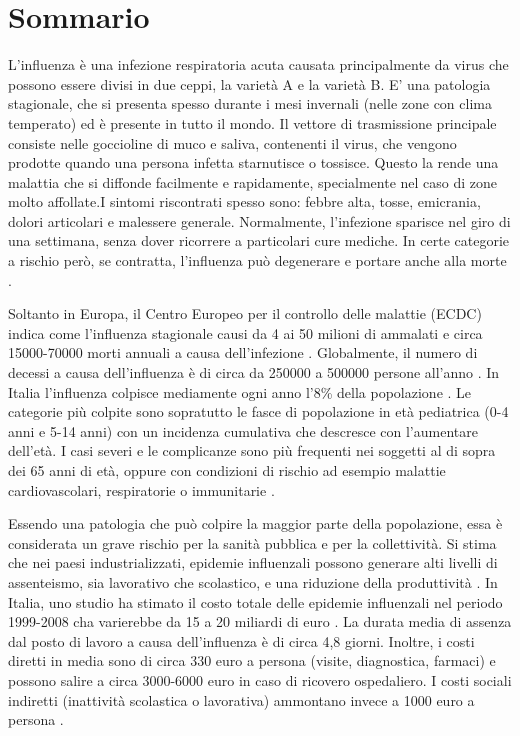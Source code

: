 \chapter*{Sommario} %
\label{sommario}


\bigskip
L'influenza è una infezione respiratoria acuta causata principalmente da virus che possono
essere divisi in due ceppi, la varietà A e la varietà B. E' una patologia stagionale,
che si presenta spesso durante i mesi invernali (nelle zone con clima temperato) ed è presente in tutto il mondo.
Il vettore di trasmissione principale consiste nelle goccioline di muco e saliva, contenenti il virus, che vengono prodotte
quando una persona infetta starnutisce o tossisce. Questo la rende una malattia che si diffonde facilmente e rapidamente, 
specialmente nel caso di zone molto affollate.I sintomi riscontrati spesso sono: febbre alta, tosse, emicrania, dolori articolari 
e malessere generale. Normalmente, l'infezione sparisce nel giro di una settimana, senza 
dover ricorrere a particolari cure mediche. In certe categorie a rischio però, se contratta, 
l'influenza può degenerare e portare anche alla morte \cite{whoinfluenza_keyfacts}. 
\bigskip

Soltanto in Europa, il Centro Europeo per il controllo delle malattie (ECDC) indica come l'influenza
stagionale causi da 4 ai 50 milioni di ammalati e circa 15000-70000 morti annuali a causa dell'infezione \cite{ecdc_keyfacts}.
Globalmente, il numero di decessi a causa dell'influenza è di circa da 250000 a 500000 persone all'anno \cite{whoinfluenza_keyfacts}.  
In Italia l'influenza colpisce mediamente ogni anno l'8\% della popolazione \cite{epicentro}.
Le categorie più colpite sono sopratutto le fasce di popolazione in età pediatrica (0-4 anni e 5-14 anni)
con un incidenza cumulativa che descresce con l'aumentare dell'età. I casi severi e le complicanze
sono più frequenti nei soggetti al di sopra dei 65 anni di età, oppure con condizioni di rischio
ad esempio malattie cardiovascolari, respiratorie o immunitarie \cite{epicentro}.  
\bigskip

Essendo una patologia che può colpire la maggior parte della popolazione, essa è considerata
un grave rischio per la sanità pubblica e per la collettività. Si stima che nei paesi industrializzati,
epidemie influenzali possono generare alti livelli di assenteismo, sia lavorativo che scolastico,
e una riduzione della produttività \cite{whoinfluenza_keyfacts}. 
In Italia, uno studio ha stimato il costo totale delle epidemie influenzali nel periodo 1999-2008
cha varierebbe da 15 a 20 miliardi di euro \cite{PLLai2011}. La durata media di assenza dal posto di lavoro a causa
dell'influenza è di circa 4,8 giorni. Inoltre, i costi diretti in media sono di circa 330 euro a persona
(visite, diagnostica, farmaci) e possono salire a circa 3000-6000 euro in caso di ricovero ospedaliero.
I costi sociali indiretti (inattività scolastica o lavorativa) ammontano invece a 1000 euro a persona \cite{Sessa2005}.
\bigskip

